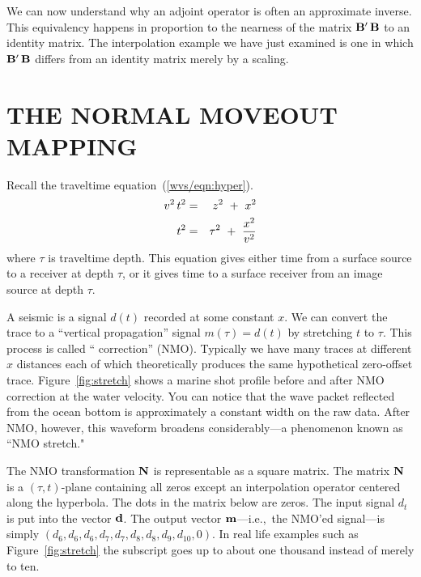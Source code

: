 \par
We can now understand why an adjoint operator is often an
approximate inverse.
This equivalency happens in proportion to the nearness of the matrix
$\bold B'\,\bold B$
to an identity matrix.
The interpolation example we have just examined is one in which
$\bold B'\,\bold B$
differs from an identity matrix merely by a scaling.

\section{THE NORMAL MOVEOUT MAPPING}
Recall the traveltime equation~(\ref{wvs/eqn:hyper}).
\begin{eqnarray}
v^2 \, t^2
&=&
z^2 \ +\  x^2
\\
t^2
&=&
\tau^2 \ +\ { x^2   \over  v^2 } 
\end{eqnarray}
where $\tau$ is traveltime depth.
This equation gives either time from a surface source
to a receiver at depth $\tau$,
or it gives time to a surface receiver
from an image source at depth $\tau$.

\par
A seismic  is a signal $d(t)$
recorded at some constant $x$.
We can convert the trace
to a ``vertical propagation'' signal
$m(\tau)=d(t)$
by stretching $t$ to $\tau$.
This process is called
`` correction'' (NMO).
Typically we have many traces at different $x$ distances
each of which theoretically produces the same
hypothetical zero-offset trace.
Figure~\ref{fig:stretch} shows a marine shot profile
before and after NMO correction at the water velocity.
You can notice that the wave packet reflected from the ocean bottom
is approximately a constant width on the raw data.
After NMO, however,
this waveform broadens considerably---a phenomenon known
as ``NMO stretch."


\par
The  NMO  transformation ${\bf N}$ is representable as a square matrix.
The matrix  ${\bf N}$  is a $(\tau,t)$-plane containing all zeros
except an interpolation operator centered along the hyperbola.
The dots in the matrix below are zeros.
The input signal $d_t$ is put into the vector $\bold d$.
The output vector $\bold m$---i.e.,~the NMO'ed signal---is simply
$(d_6,d_6,d_6, d_7,d_7, d_8,d_8, d_9, d_{10}, 0)$.
In real life examples such as Figure~\ref{fig:stretch}
the subscript goes up to about one thousand instead of
merely to ten.

